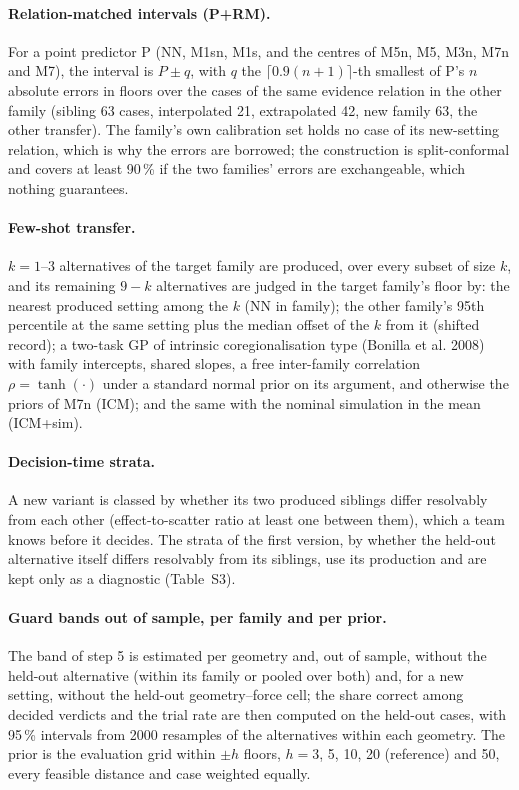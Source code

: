 \documentclass[pdflatex,sn-basic]{sn-jnl}
\begin{document}
\paragraph{Relation-matched intervals (P+RM).} For a point predictor P (NN, M1sn, M1s, and the centres of M5n, M5, M3n, M7n and M7), the interval is $P\pm q$, with $q$ the $\lceil 0.9(n+1)\rceil$-th smallest of P's $n$ absolute errors in floors over the cases of the same evidence relation in the other family (sibling 63 cases, interpolated 21, extrapolated 42, new family 63, the other transfer). The family's own calibration set holds no case of its new-setting relation, which is why the errors are borrowed; the construction is split-conformal and covers at least 90\,\% if the two families' errors are exchangeable, which nothing guarantees.

\paragraph{Few-shot transfer.} $k=1$--3 alternatives of the target family are produced, over every subset of size $k$, and its remaining $9-k$ alternatives are judged in the target family's floor by: the nearest produced setting among the $k$ (NN in family); the other family's 95th percentile at the same setting plus the median offset of the $k$ from it (shifted record); a two-task GP of intrinsic coregionalisation type (Bonilla et al. 2008) with family intercepts, shared slopes, a free inter-family correlation $\rho=\tanh(\cdot)$ under a standard normal prior on its argument, and otherwise the priors of M7n (ICM); and the same with the nominal simulation in the mean (ICM+sim).

\paragraph{Decision-time strata.} A new variant is classed by whether its two produced siblings differ resolvably from each other (effect-to-scatter ratio at least one between them), which a team knows before it decides. The strata of the first version, by whether the held-out alternative itself differs resolvably from its siblings, use its production and are kept only as a diagnostic (Table~S3).

\paragraph{Guard bands out of sample, per family and per prior.} The band of step 5 is estimated per geometry and, out of sample, without the held-out alternative (within its family or pooled over both) and, for a new setting, without the held-out geometry--force cell; the share correct among decided verdicts and the trial rate are then computed on the held-out cases, with 95\,\% intervals from 2000 resamples of the alternatives within each geometry. The prior is the evaluation grid within $\pm h$ floors, $h=3$, 5, 10, 20 (reference) and 50, every feasible distance and case weighted equally.
\end{document}
